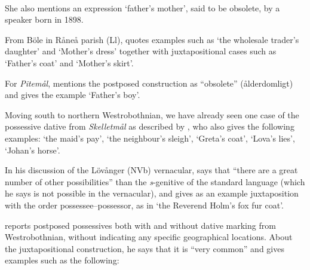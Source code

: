\ea\label{}
\\

\z 
\z

She also mentions an expression  ‘father’s mother’, said to be obsolete, by a speaker born in 1898.

From Böle in Råneå parish (Ll), \citet[113]{Wikberg2004} quotes examples such as  ‘the wholesale trader’s daughter’ and  ‘Mother’s dress’ together with juxtapositional cases such as  ‘Father’s coat’ and  ‘Mother’s skirt’.

For \textit{Pitemål}, \citet[11]{Brännström1993} mentions the postposed construction as “obsolete” (ålderdomligt) and gives the example  ‘Father’s boy’. 

Moving south to northern Westrobothnian, we have already seen one case of the possessive dative from \textit{Skelletmål} as described by \citet[22]{Marklund1976}, who also gives the following examples:  ‘the maid’s pay’,  ‘the neighbour’s sleigh’,  ‘Greta’s coat’,  ‘Lova’s lies’, ‘Johan’s horse’. 

In his discussion of the Lövånger (NVb) vernacular, \citet[208]{Holm1942} says that “there are a great number of other possibilities” than the \textit{s}{}-genitive of the standard language (which he says is not possible in the vernacular), and gives as an example juxtaposition with the order possessee–possessor, as in  ‘the Reverend Holm’s fox fur coat’. 

\citet[125]{Larsson1929} reports postposed possessives both with and without dative marking from Westrobothnian, without indicating any specific geographical locations. About the juxtapositional construction, he says that it is “very common” and gives examples such as the following:

